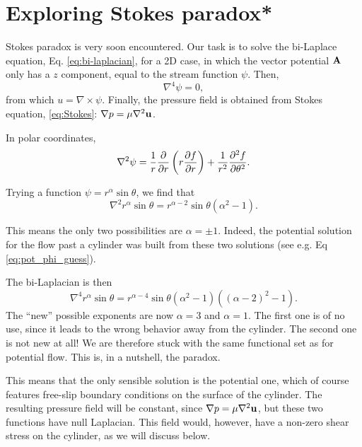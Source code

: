 \section{Exploring Stokes paradox*}
\label{sec:creeping_cylinder}

Stokes paradox is very soon encountered. Our task is to solve the
bi-Laplace equation, Eq. \ref{eq:bi-laplacian}, for a 2D case, in
which the vector potential $\mathbf{A}$ only has a $z$ component, equal to
the stream function $\psi$. Then,
\[
  \nabla^4 \psi = 0 ,
\]
from which $u=\nabla\times\psi$. Finally, the pressure field is
obtained from Stokes equation, \ref{eq:Stokes}:
$\nabla p = \mu \nabla^2 \mathbf{u}$.

In polar coordinates,
\begin{equation}
  \label{eq:Lapl_in_polar}
  \nabla^2 \psi =
  {1 \over  r}{\partial \over \partial  r}\left(
    r {\partial f \over \partial  r}\right)
  + {1 \over  r^2}{\partial^2 f \over \partial \theta^2} .
\end{equation}

Trying a function $\psi = r^\alpha \sin\theta$, we find that
\begin{equation*}
  \nabla^2   r^\alpha \sin\theta  =
  r^{\alpha-2} \sin\theta \left( \alpha^2 -1  \right) .
\end{equation*}

This means the only two possibilities are $\alpha=\pm 1$. Indeed, the
potential solution for the flow past a cylinder was built from these
two solutions (see e.g. Eq \ref{eq:pot_phi_guess}).

The bi-Laplacian is then
\begin{equation*}
  \nabla^4   r^\alpha \sin\theta  =
  r^{\alpha-4} \sin\theta
  \left( \alpha^2 -1  \right)
  \left( (\alpha-2)^2 -1  \right) .
\end{equation*}
The ``new'' possible exponents are now $\alpha=3$ and $\alpha=1$. The
first one is of no use, since it leads to the wrong behavior away from
the cylinder. The second one is not new at all! We are therefore stuck
with the same functional set as for potential flow. This is, in a
nutshell, the paradox.

This means that the only sensible solution is the potential one, which
of course features free-slip boundary conditions on the surface of the
cylinder. The resulting pressure field will be constant, since
$\nabla p = \mu \nabla^2 \mathbf{u}$, but these two functions have null
Laplacian. This field would, however, have a non-zero shear stress on
the cylinder, as we will discuss below.

